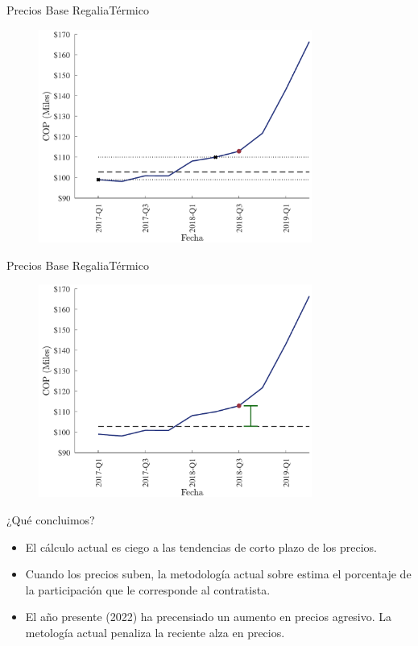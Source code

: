 \documentclass[usenames,dvipsnames]{beamer}
\begin{document}
\begin{frame}{Precios Base Regalia}{Térmico}
    \begin{figure}
        \centering
        \includegraphics[width=0.8\textwidth]{Figures/oldCalc3.pdf}
    \end{figure}
\end{frame}

\begin{frame}{Precios Base Regalia}{Térmico}
    \begin{figure}
        \centering
        \includegraphics[width=0.8\textwidth]{Figures/oldCalc4.pdf}
    \end{figure}
\end{frame}

\begin{frame}{¿Qué concluimos?}
\begin{itemize}
    \item El cálculo actual es ciego a las tendencias de corto plazo de los precios. 
    \item Cuando los precios suben, la metodología actual sobre estima el porcentaje de la participación que le corresponde al contratista. 
    \item El año presente (2022) ha precensiado un aumento en precios agresivo. La metología actual penaliza la reciente alza en precios. 
\end{itemize}
\end{frame}
\end{document}
